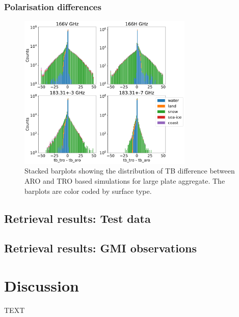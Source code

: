\documentclass[amt, manuscript]{copernicus}
\begin{document}
\subsubsection{Polarisation differences}

\begin{figure}[t]
\includegraphics[width=8.3cm]{Figures/hist_surfacetype_tro_aro.pdf}
\caption{Stacked barplots showing the distribution of TB difference between ARO and TRO based simulations for large plate aggregate. The barplots are color coded by surface type.}
\label{fig:hist_surfacetype}
\end{figure}




\subsection{Retrieval results: Test data}
%


\subsection{Retrieval results: GMI observations}

\section{Discussion}


\conclusions  %
TEXT


\end{document}
